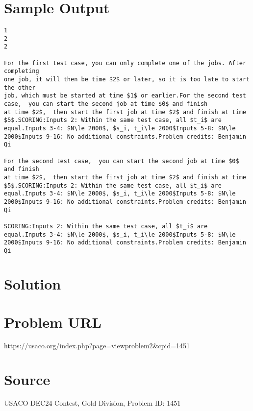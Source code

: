 \documentclass[12pt]{article}
\begin{document}
\section*{Sample Output}
\begin{verbatim}
1
2
2

For the first test case, you can only complete one of the jobs. After completing
one job, it will then be time $2$ or later, so it is too late to start the other
job, which must be started at time $1$ or earlier.For the second test case,  you can start the second job at time $0$ and finish
at time $2$,  then start the first job at time $2$ and finish at time $5$.SCORING:Inputs 2: Within the same test case, all $t_i$ are equal.Inputs 3-4: $N\le 2000$, $s_i, t_i\le 2000$Inputs 5-8: $N\le 2000$Inputs 9-16: No additional constraints.Problem credits: Benjamin Qi

For the second test case,  you can start the second job at time $0$ and finish
at time $2$,  then start the first job at time $2$ and finish at time $5$.SCORING:Inputs 2: Within the same test case, all $t_i$ are equal.Inputs 3-4: $N\le 2000$, $s_i, t_i\le 2000$Inputs 5-8: $N\le 2000$Inputs 9-16: No additional constraints.Problem credits: Benjamin Qi

SCORING:Inputs 2: Within the same test case, all $t_i$ are equal.Inputs 3-4: $N\le 2000$, $s_i, t_i\le 2000$Inputs 5-8: $N\le 2000$Inputs 9-16: No additional constraints.Problem credits: Benjamin Qi
\end{verbatim}

\section*{Solution}


\section*{Problem URL}
https://usaco.org/index.php?page=viewproblem2&cpid=1451

\section*{Source}
USACO DEC24 Contest, Gold Division, Problem ID: 1451
\end{document}
